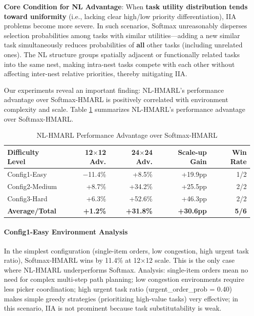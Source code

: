 \documentclass[12pt,a4paper]{article}
\begin{document}
\textbf{Core Condition for NL Advantage}: When \textbf{task utility distribution tends toward uniformity} (i.e., lacking clear high/low priority differentiation), IIA problems become more severe. In such scenarios, Softmax unreasonably disperses selection probabilities among tasks with similar utilities---adding a new similar task simultaneously reduces probabilities of \textbf{all} other tasks (including unrelated ones). The NL structure groups spatially adjacent or functionally related tasks into the same nest, making intra-nest tasks compete with each other without affecting inter-nest relative priorities, thereby mitigating IIA.

Our experiments reveal an important finding: NL-HMARL's performance advantage over Softmax-HMARL is positively correlated with environment complexity and scale. Table \ref{tab:nl_advantage} summarizes NL-HMARL's performance advantage over Softmax-HMARL.

\begin{table}[ht]
\centering
\caption{NL-HMARL Performance Advantage over Softmax-HMARL}
\label{tab:nl_advantage}
\begin{tabular}{lrrrr}
\toprule
\textbf{Difficulty Level} & \textbf{12$\times$12 Adv.} & \textbf{24$\times$24 Adv.} & \textbf{Scale-up Gain} & \textbf{Win Rate} \\
\midrule
Config1-Easy & $-$11.4\% & +8.5\% & +19.9pp & 1/2 \\
Config2-Medium & +8.7\% & +34.2\% & +25.5pp & 2/2 \\
Config3-Hard & +6.3\% & +52.6\% & +46.3pp & 2/2 \\
\midrule
\textbf{Average/Total} & \textbf{+1.2\%} & \textbf{+31.8\%} & \textbf{+30.6pp} & \textbf{5/6} \\
\bottomrule
\end{tabular}
\end{table}

\paragraph{Config1-Easy Environment Analysis}

In the simplest configuration (single-item orders, low congestion, high urgent task ratio), Softmax-HMARL wins by 11.4\% at 12$\times$12 scale. This is the only case where NL-HMARL underperforms Softmax. Analysis: single-item orders mean no need for complex multi-step path planning; low congestion environments require less picker coordination; high urgent task ratio (urgent\_order\_prob = 0.40) makes simple greedy strategies (prioritizing high-value tasks) very effective; in this scenario, IIA is not prominent because task substitutability is weak.
\end{document}
